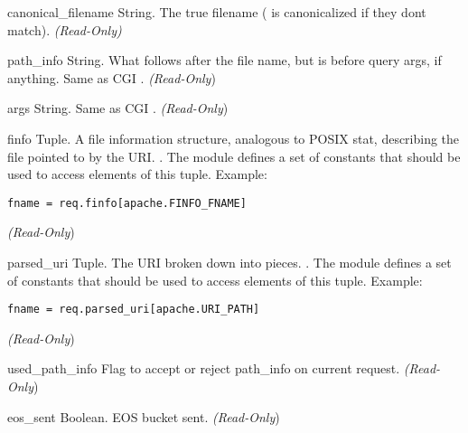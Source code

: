 \begin{memberdesc}[request]{canonical_filename}
  String. The true filename ( is canonicalized if
  they dont match).  \emph{(Read-Only)}
\end{memberdesc}

\begin{memberdesc}[request]{path_info}
  String. What follows after the file name, but is before query args, if
  anything. Same as CGI .
  \emph{(Read-Only})
\end{memberdesc}

\begin{memberdesc}[request]{args}
  String. Same as CGI .
  \emph{(Read-Only})
\end{memberdesc}

\begin{memberdesc}[request]{finfo}
  Tuple. A file information structure, analogous to POSIX stat,
  describing the file pointed to by the URI.  . The  module defines a set of 
  constants that should be used to access elements of this
  tuple. Example:
  \begin{verbatim}
fname = req.finfo[apache.FINFO_FNAME]
  \end{verbatim}
  \emph{(Read-Only})
\end{memberdesc}

\begin{memberdesc}[request]{parsed_uri}
  Tuple. The URI broken down into pieces.
  . 
  The  module defines a set of  constants that
  should be used to access elements of this tuple. Example:
  \begin{verbatim}
fname = req.parsed_uri[apache.URI_PATH]
  \end{verbatim}
  \emph{(Read-Only})
\end{memberdesc}

\begin{memberdesc}[request]{used_path_info}
  Flag to accept or reject path_info on current request.
  \emph{(Read-Only})
\end{memberdesc}

\begin{memberdesc}[request]{eos_sent}
  Boolean. EOS bucket sent.
  \emph{(Read-Only})
\end{memberdesc}

